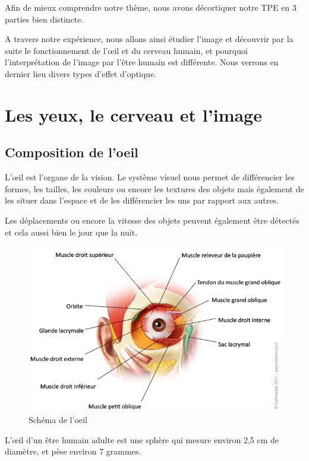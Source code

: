 \documentclass[a4paper, 12pt, onecolumn, openany]{report}
\begin{document}
	Afin de mieux comprendre notre thème,  nous avons décortiquer notre TPE en 3 parties bien distincte.
	
	A travers notre expérience, nous allons ainsi étudier l’image et découvrir par la suite le fonctionnement de l’œil et du cerveau humain, et pourquoi l’interprétation de l’image par l’être humain est différente. Nous verrons en dernier lieu divers types d’effet d’optique.
	
\chapter{Les yeux, le cerveau et l'image}
	\section{Composition de l'oeil}
	L’œil est l’organe de la vision. Le système visuel nous permet de différencier les formes, les tailles, les couleurs ou encore les textures des objets mais également de les situer dans l’espace et de les différencier les uns par rapport aux autres. 
	
	Les déplacements ou encore la vitesse des objets peuvent également être détectés et cela aussi bien le jour que 
la nuit.	

	\begin{figure}[h]
	\includegraphics[scale=0.5]{oeil.jpg}
	\caption{Schéma de l'oeil}
	\label{Schéma de l'oeil}
	\end{figure}
	
	\newpage
	
	L’œil d’un être humain adulte est une sphère qui mesure environ 2,5 cm de diamètre, et pèse environ 7 grammes. 
	
\end{document}
